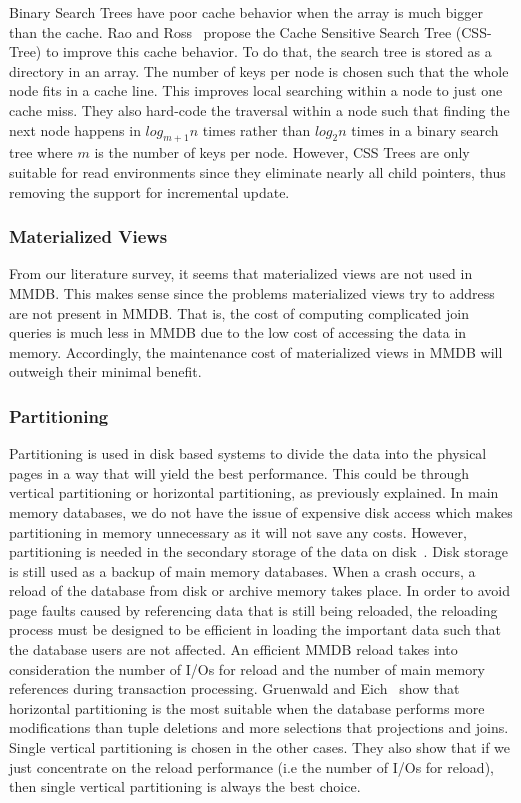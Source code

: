 \documentclass[12pt,a4paper]{article}
\begin{document}
Binary Search Trees have poor cache behavior when the array is much bigger than the cache. Rao and Ross~\cite{rao1999cache} propose the Cache Sensitive Search
Tree (CSS-Tree) to improve this cache behavior. To do that, the search tree is stored as a directory in an array. The number of keys per node is chosen such
that the whole node fits in a cache line. This improves local searching within a node to just one cache miss. They also hard-code the traversal within a node
such that finding the next node happens in $log_{m+1}n$ times rather than $log_{2}n$ times in a binary search tree where $m$ is the number of keys per node.
However, CSS Trees are only suitable for read environments since they eliminate nearly all child pointers, thus removing the support for incremental update.

\subsubsection{Materialized Views}
From our literature survey, it seems that materialized views are not used in MMDB. This makes sense since the problems materialized views try to address are
not present in MMDB. That is, the cost of computing complicated join queries is much less in MMDB due to the low cost of accessing the data in memory.
Accordingly, the maintenance cost of materialized views in MMDB will outweigh their minimal benefit.

\subsubsection{Partitioning}

Partitioning is used in disk based systems to divide the data into the physical pages in a way that will yield the best performance. This could be through
vertical partitioning or horizontal partitioning, as previously explained. In main memory databases, we do not have the issue of expensive disk access which
makes partitioning in memory unnecessary as it will not save any costs. However, partitioning is needed in the secondary storage of the data on
disk~\cite{gruenwald1990database}. Disk storage is still used as a backup of main memory databases. When a crash occurs, a reload of the database from disk or
archive memory takes place. In order to avoid page faults caused by referencing data that is still being reloaded, the reloading process must be designed to be
efficient in loading the important data such that the database users are not affected. An efficient MMDB reload takes into consideration the number of I/Os for
reload and the number of main memory references during transaction processing. Gruenwald and Eich~\cite{gruenwald1990database,gruenwald1990choosing} show that
horizontal partitioning is the most suitable when the database performs more modifications than tuple deletions and more selections that projections and joins.
Single vertical partitioning is chosen in the other cases. They also show that if we just concentrate on the reload performance (i.e the number of I/Os for
reload), then single vertical partitioning is always the best choice.
\end{document}
